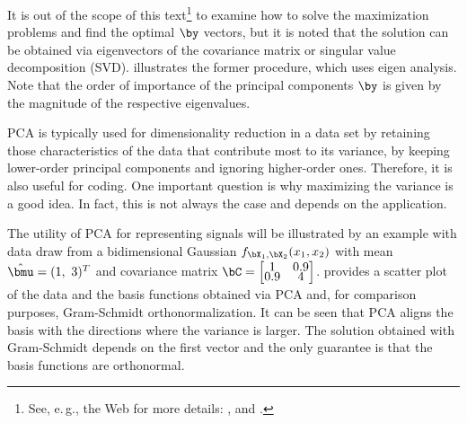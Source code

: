 It is out of the scope of this text\footnote{See, e.\,g., the Web for more details:  , 
and .} to examine how to solve the maximization problems and find the optimal $\by$ vectors, but it is noted that the solution can be obtained via eigenvectors of the covariance matrix or singular value decomposition (SVD).  illustrates the former procedure, which uses eigen analysis. Note that the order of importance of the principal components $\by$ is given by the magnitude of the respective eigenvalues.


PCA is typically used for dimensionality reduction in a data set by retaining those characteristics of the data that contribute most to its variance, by keeping lower-order principal components and ignoring higher-order ones. Therefore, it is also useful for coding. One important question is why maximizing the variance is a good idea. In fact, this is not always the case and depends on the application.


The utility of PCA for representing signals will be illustrated by an example with data draw from a bidimensional Gaussian
$f_{\bX_1,\bX_2}(x_1,x_2)$ with mean $\hat{\bmu}=(1,~3)^T$ and covariance matrix
$\bC =
    \begin{bmatrix}
    1 & 0.9 \\[-1ex]
    0.9 & 4 \\
    \end{bmatrix}
$.  provides a scatter plot of the data and the basis functions obtained via PCA and, for comparison purposes, Gram-Schmidt orthonormalization. It can be seen that PCA aligns the basis with the directions where the variance is larger. The solution obtained with Gram-Schmidt depends on the first vector and the only guarantee is that the basis functions are orthonormal.


